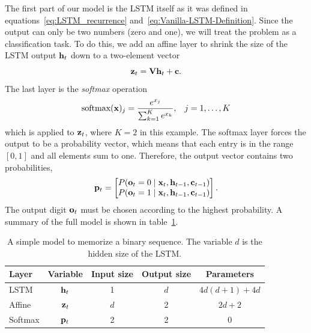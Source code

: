 		The first part of our model is the LSTM itself as it was defined in equations~\ref{eq:LSTM_recurrence} and~\ref{eq:Vanilla-LSTM-Definition}.
		Since the output can only be two numbers (zero and one), we will treat the problem as a classification task.
		To do this, we add an affine layer to shrink the size of the LSTM output $\mathbf{h}_t$ down to a two-element vector
		\begin{equation}
			\mathbf{z}_t = \mathbf{V} \mathbf{h}_t + \mathbf{c}.
		\end{equation}
		The last layer is the \emph{softmax} operation
		\begin{eqnarray}
			\text{softmax}(\mathbf{x})_j = \frac{e^{x_{j}}}{\sum_{k=1}^{K} e^{x_{k}}},  & & j = 1, \dots, K
		\end{eqnarray}
		which is applied to $\mathbf{z}_t$, where $K = 2$ in this example.
		The softmax layer forces the output to be a probability vector, which means that each entry is in the range $[0, 1]$ and all elements sum to one.
		Therefore, the output vector contains two probabilities, 
		\begin{equation*}
			\mathbf{p}_t = 
			\begin{bmatrix}
				P(\mathbf{o}_t = 0 \mid \mathbf{x}_t, \mathbf{h}_{t - 1}, \mathbf{c}_{t - 1}) \\ 
				P(\mathbf{o}_t = 1 \mid \mathbf{x}_t, \mathbf{h}_{t - 1}, \mathbf{c}_{t - 1})
			\end{bmatrix}.
		\end{equation*}
		The output digit $\mathbf{o}_t$ must be chosen according to the highest probability.
		A summary of the full model is shown in table~\ref{tbl:model_classification_binary_digits}.
		\begin{table}
			\small
			\begin{center}
				\begin{tabular}{|l|c|c|c|c|}
					\hline
					Layer 	& Variable 			& Input size 	& Output size 	& Parameters 			\\ \hline
					LSTM 	& $\mathbf{h}_t$		& 1 			& $d$ 			& $4d(d + 1) + 4d$ 		\\ \hline
					Affine 	& $\mathbf{z}_t$		& $d$ 			& 2 			& $2d + 2$ 				\\ \hline
					Softmax & $\mathbf{p}_t$		& 2 			& 2 			& 0						\\ \hline
				\end{tabular}
			\end{center}
			\caption[A simple model to memorize a binary sequence]
					{A simple model to memorize a binary sequence. 
					 The variable $d$ is the hidden size of the LSTM.}
			\label{tbl:model_classification_binary_digits}
		\end{table}
		
